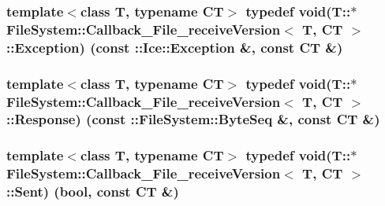 \subsubsection[{Exception}]{\setlength{\rightskip}{0pt plus 5cm}template$<$class T, typename C\+T$>$ typedef void(T\+::$\ast$ {\bf File\+System\+::\+Callback\+\_\+\+File\+\_\+receive\+Version}$<$ T, C\+T $>$\+::Exception) (const \+::Ice\+::\+Exception \&, const C\+T \&)}\label{class_file_system_1_1_callback___file__receive_version_a8ec034c43b3913243caf48c7de06f99d}
\hypertarget{class_file_system_1_1_callback___file__receive_version_ab5743b6627d5fde356fc7381fcc4613a}{}
\subsubsection[{Response}]{\setlength{\rightskip}{0pt plus 5cm}template$<$class T, typename C\+T$>$ typedef void(T\+::$\ast$ {\bf File\+System\+::\+Callback\+\_\+\+File\+\_\+receive\+Version}$<$ T, C\+T $>$\+::Response) (const \+::{\bf File\+System\+::\+Byte\+Seq} \&, const C\+T \&)}\label{class_file_system_1_1_callback___file__receive_version_ab5743b6627d5fde356fc7381fcc4613a}
\hypertarget{class_file_system_1_1_callback___file__receive_version_a70f13401fd06a120da116b0b17ea67d0}{}
\subsubsection[{Sent}]{\setlength{\rightskip}{0pt plus 5cm}template$<$class T, typename C\+T$>$ typedef void(T\+::$\ast$ {\bf File\+System\+::\+Callback\+\_\+\+File\+\_\+receive\+Version}$<$ T, C\+T $>$\+::Sent) (bool, const C\+T \&)}\label{class_file_system_1_1_callback___file__receive_version_a70f13401fd06a120da116b0b17ea67d0}
\hypertarget{class_file_system_1_1_callback___file__receive_version_ad3c99b998d7a847dca7193dd3cad8cf1}{}
